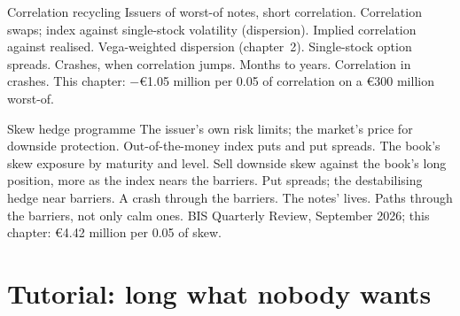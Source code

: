\begin{strategyfile}{Correlation recycling}\label{strat:s2:hedging-a-structured-products-book:corr}
 Issuers of worst-of notes, short correlation.
 Correlation swaps; index against single-stock volatility (dispersion).
 Implied correlation against realised.
 Vega-weighted dispersion (chapter~2).
 Single-stock option spreads.
 Crashes, when correlation jumps.
 Months to years.
 Correlation in crashes.
 This chapter: $-$\euro1.05 million per 0.05 of correlation on a \euro300 million worst-of.
\end{strategyfile}

\begin{strategyfile}{Skew hedge programme}\label{strat:s2:hedging-a-structured-products-book:skew}
 The issuer's own risk limits; the market's price for downside protection.
 Out-of-the-money index puts and put spreads.
 The book's skew exposure by maturity and level.
 Sell downside skew against the book's long position, more as the index nears the barriers.
 Put spreads; the destabilising hedge near barriers.
 A crash through the barriers.
 The notes' lives.
 Paths through the barriers, not only calm ones.
 BIS Quarterly Review, September 2026; this chapter: \euro4.42 million per 0.05 of skew.
\end{strategyfile}

\section{Tutorial: long what nobody wants}\label{tut:s2:hedging-a-structured-products-book:tut}

